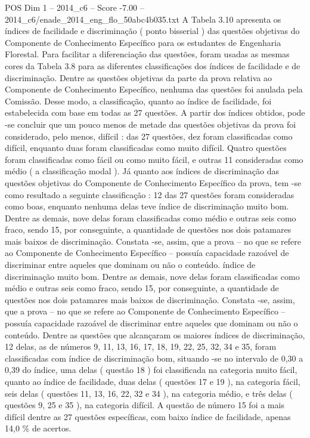 \begin{textsample}{POS Dim 1 – 2014\_c6 – Score -7.00 – 2014\_c6/enade\_2014\_eng\_flo\_50abc4b035.txt}
A Tabela 3.10 apresenta os índices de facilidade e discriminação ( ponto bisserial ) das questões objetivas do Componente de Conhecimento Específico para os estudantes de Engenharia Florestal.
Para facilitar a diferenciação das questões, foram usadas as mesmas cores da Tabela 3.8 para as diferentes classificações dos índices de facilidade e de discriminação.
Dentre as questões objetivas da parte da prova relativa ao Componente de Conhecimento Específico, nenhuma das questões foi anulada pela Comissão.
Desse modo, a classificação, quanto ao índice de facilidade, foi estabelecida com base em todas as 27 questões.
A partir dos índices obtidos, pode -se concluir que um pouco menos de metade das questões objetivas da prova foi considerado, pelo menos, difícil : das 27 questões, dez foram classificadas como difícil, enquanto duas foram classificadas como muito difícil.
Quatro questões foram classificadas como fácil ou como muito fácil, e outras 11 consideradas como médio ( a classificação modal ).
Já quanto aos índices de discriminação das questões objetivas do Componente de Conhecimento Específico da prova, tem -se como resultado a seguinte classificação : 12 das 27 questões foram consideradas como boas, enquanto nenhuma delas teve índice de discriminação muito bom.
Dentre as demais, nove delas foram classificadas como médio e outras seis como fraco, sendo 15, por conseguinte, a quantidade de questões nos dois patamares mais baixos de discriminação.
Constata -se, assim, que a prova – no que se refere ao Componente de Conhecimento Específico – possuía capacidade razoável de discriminar entre aqueles que dominam ou não o conteúdo. índice de discriminação muito bom.
Dentre as demais, nove delas foram classificadas como médio e outras seis como fraco, sendo 15, por conseguinte, a quantidade de questões nos dois patamares mais baixos de discriminação.
Constata -se, assim, que a prova – no que se refere ao Componente de Conhecimento Específico – possuía capacidade razoável de discriminar entre aqueles que dominam ou não o conteúdo.
Dentre as questões que alcançaram os maiores índices de discriminação, 12 delas, as de números 9, 11, 13, 16, 17, 18, 19, 22, 25, 32, 34 e 35, foram classificadas com índice de discriminação bom, situando -se no intervalo de 0,30 a 0,39 do índice, uma delas ( questão 18 ) foi classificada na categoria muito fácil, quanto ao índice de facilidade, duas delas ( questões 17 e 19 ), na categoria fácil, seis delas ( questões 11, 13, 16, 22, 32 e 34 ), na categoria médio, e três delas ( questões 9, 25 e 35 ), na categoria difícil.
A questão de número 15 foi a mais difícil dentre as 27 questões específicas, com baixo índice de facilidade, apenas 14,0 \% de acertos.

\end{textsample}
